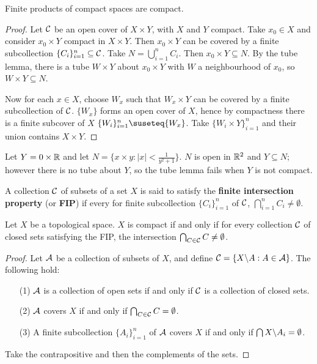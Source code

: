 \begin{theorem}\label{3.4.7}
    Finite products of compact spaces are compact.
\end{theorem}
\begin{proof}
    Let $\mathcal{C}$ be an open cover of  $X \times Y$, with  $X$ and  $Y$ compact. Take  $x_0 \in X$ and
    consider $x_0 \times Y$ compact in $X \times Y$. Then  $x_0 \times Y$ can be covered by a finite
    subcollection $\{C_i\}_{i=1}^n \subseteq \mathcal{C}$. Take $N=\bigcup_{i=1}^n{C_i}$. Then $x_0 \times Y
    \subseteq N$. By the tube lemma, there is a tube $W \times Y$ about  $x_0 \times Y$ with $W$ a
    neighbourhood of  $x_0$, so $W \times Y \subseteq N$.

    Now for each $x \in X$, choose  $W_x$ such that  $W_x \times Y$ can be covered by a finite
    subcollection of  $\mathcal{C}$. $\{W_x\}$ forms an open cover of $X$, hence by compactness there is a
    finite subcover of  $X$  $\{W_i\}_{i=1}^n \suseteq \{W_x\}$. Take $\{W_i \times Y\}_{i=1}^n$ and
    their union contains $X \times Y$.
\end{proof}

\begin{example}
    Let $Y=0 \times \mathbb{R}$ and let  $N=\{x \times y: |x|<\frac{1}{y^2+1}\}$. $N$ is open in  $\mathbb{R}^2$ and
     $Y \subseteq N$; however there is no tube about  $Y$, so the tube lemma fails when  $Y$ is not
     compact.
\end{example} 

\begin{definition}
    A collection $\mathcal{C}$ of subsets of a set  $X$ is said to satisfy the  \textbf{finite intersection
    property} (or \textbf{FIP}) if every for finite subcollection $\{C_i\}_{i=1}^n$ of $\mathcal{C}$,
    $\bigcap_{i=1}^n{C_i} \neq \emptyset$.
\end{definition}

\begin{theorem}\label{3.4.8}
    Let $X$ be a topological space.  $X$ is compact if and only if for every collection  $\mathcal{C}$ of
    closed sets satisfying the FIP, the intersection $\bigcap_{C \in \mathcal{C}}{C} \neq \emptyset$.
\end{theorem}
\begin{proof}
    Let $\mathcal{A}$ be a collection of subsets of  $X$, and define  $\mathcal{C}=\{X \backslash A:A \in \mathcal{A}\}$. The
    following hold:
    \begin{enumerate}
        \item[(1)] $\mathcal{A}$ is a collection of open sets if and only if $\mathcal{C}$ is a collection of closed
            sets.

        \item [(2)] $\mathcal{A}$ covers  $X$ if and only if  $\bigcap_{C \in \mathcal{C}}{C}=\emptyset$.

        \item[(3)] A finite subcollection $\{A_i\}_{i=1}^n$ of $\mathcal{A}$ covers  $X$ if and only if
            $\bigcap{X \backslash A_i}=\emptyset$.
    \end{enumerate}
    Take the contrapositive and then the complements of the sets.
\end{proof}
